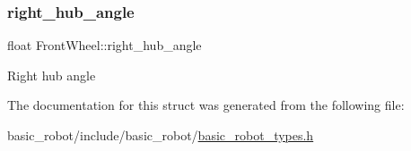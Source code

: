\subsubsection{\texorpdfstring{right\+\_\+hub\+\_\+angle}{right\_hub\_angle}}
{\footnotesize\ttfamily float Front\+Wheel\+::right\+\_\+hub\+\_\+angle}

Right hub angle 

The documentation for this struct was generated from the following file\+:\begin{DoxyCompactItemize}
\item 
basic\+\_\+robot/include/basic\+\_\+robot/\hyperlink{basic__robot__types_8h}{basic\+\_\+robot\+\_\+types.\+h}\end{DoxyCompactItemize}
